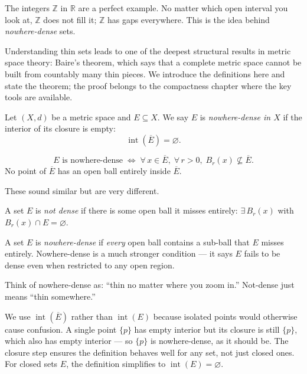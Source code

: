 The integers $\mathbb{Z}$ in $\mathbb{R}$ are a perfect example.
No matter which open interval you look at, $\mathbb{Z}$ does not
fill it; $\mathbb{Z}$ has gaps everywhere.
This is the idea behind \emph{nowhere-dense} sets.

Understanding thin sets leads to one of the deepest structural results
in metric space theory: Baire's theorem, which says that a complete
metric space cannot be built from countably many thin pieces.
We introduce the definitions here and state the theorem;
the proof belongs to the compactness chapter where the key tools are available.

\begin{tcolorbox}[colback=propbox, colframe=propborder, arc=2pt,
  left=6pt, right=6pt, top=4pt, bottom=4pt,
  title={\small\textbf{Definition (Nowhere-Dense)}},
  fonttitle=\small\bfseries]
\begin{definition}
\label{def:nowhere-dense}
Let $(X,d)$ be a metric space and $E \subseteq X$.
We say $E$ is \emph{nowhere-dense in $X$} if the interior of its closure
is empty:
\[
\operatorname{int}(\overline{E}) = \varnothing.
\]
\end{definition}
\end{tcolorbox}

\begin{remark*}
\[
E \text{ is nowhere-dense}
\;\iff\;
\forall\, x \in \overline{E},\; \forall\, r > 0,\;
B_r(x) \not\subseteq \overline{E}.
\]
No point of $\overline{E}$ has an open ball entirely inside $\overline{E}$.
\end{remark*}

\begin{remark*}
These sound similar but are very different.

A set $E$ is \emph{not dense} if there is some open ball it misses entirely:
$\exists\, B_r(x)$ with $B_r(x) \cap E = \varnothing$.

A set $E$ is \emph{nowhere-dense} if \emph{every} open ball contains a
sub-ball that $E$ misses entirely.
Nowhere-dense is a much stronger condition --- it says $E$ fails to be
dense even when restricted to any open region.

Think of nowhere-dense as: ``thin no matter where you zoom in.''
Not-dense just means ``thin somewhere.''
\end{remark*}

\begin{remark*}
We use $\operatorname{int}(\overline{E})$ rather than $\operatorname{int}(E)$
because isolated points would otherwise cause confusion.
A single point $\{p\}$ has empty interior but its closure is still $\{p\}$,
which also has empty interior --- so $\{p\}$ is nowhere-dense, as it should be.
The closure step ensures the definition behaves well for any set,
not just closed ones.
For closed sets $E$, the definition simplifies to
$\operatorname{int}(E) = \varnothing$.
\end{remark*}

